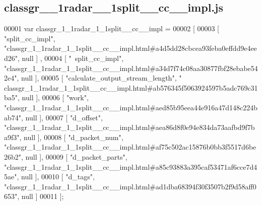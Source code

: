 \subsection{classgr\+\_\+\_\+1radar\+\_\+\_\+1split\+\_\+\+\_\+cc\+\_\+\+\_\+impl.\+js}
\label{classgr__1__1radar__1__1split____cc____impl_8js_source}

\begin{DoxyCode}
00001 var classgr_1_1radar_1_1split__cc__impl =
00002 [
00003     [ \textcolor{stringliteral}{"split\_cc\_impl"}, \textcolor{stringliteral}{"classgr\_1\_1radar\_1\_1split\_\_cc\_\_impl.html#a4d5dd28cbcea93feba0effdd9e4eed26"}, null ]
      ,
00004     [ \textcolor{stringliteral}{"~split\_cc\_impl"}, \textcolor{stringliteral}{"classgr\_1\_1radar\_1\_1split\_\_cc\_\_impl.html#a34d7f74c08aa30877fbf28ebabe542e4"}, null 
      ],
00005     [ \textcolor{stringliteral}{"calculate\_output\_stream\_length"}, \textcolor{stringliteral}{"
      classgr\_1\_1radar\_1\_1split\_\_cc\_\_impl.html#ab576345f5063924597b5adc769c31ba5"}, null ],
00006     [ \textcolor{stringliteral}{"work"}, \textcolor{stringliteral}{"classgr\_1\_1radar\_1\_1split\_\_cc\_\_impl.html#aed85b95eea44e916a47d148c224bab74"}, null ],
00007     [ \textcolor{stringliteral}{"d\_offset"}, \textcolor{stringliteral}{"classgr\_1\_1radar\_1\_1split\_\_cc\_\_impl.html#aea86d8f0e94e834da73aafbd9f7ba9f3"}, null ],
00008     [ \textcolor{stringliteral}{"d\_packet\_num"}, \textcolor{stringliteral}{"classgr\_1\_1radar\_1\_1split\_\_cc\_\_impl.html#af75c502ac15876b0bb3f5517d6be26b2"}, null ],
00009     [ \textcolor{stringliteral}{"d\_packet\_parts"}, \textcolor{stringliteral}{"classgr\_1\_1radar\_1\_1split\_\_cc\_\_impl.html#a85c93883a395caf53471af6cce7d45ae"}, null 
      ],
00010     [ \textcolor{stringliteral}{"d\_tags"}, \textcolor{stringliteral}{"classgr\_1\_1radar\_1\_1split\_\_cc\_\_impl.html#ad1dba68394f30f3507b2f9d58aff0653"}, null ]
00011 ];
\end{DoxyCode}
